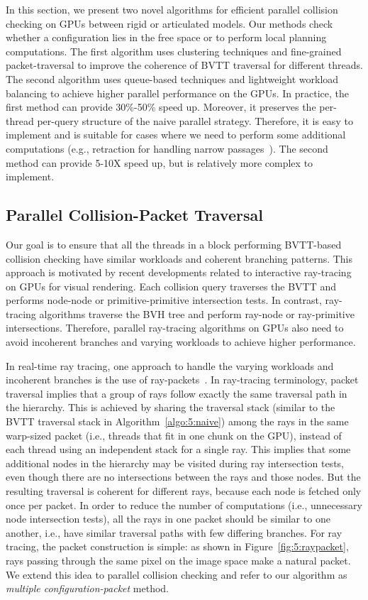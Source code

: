 In this section, we present two novel algorithms for efficient parallel collision checking on GPUs between rigid or articulated models. Our methods check whether a configuration lies in the free space or to perform local planning computations. The first algorithm uses clustering techniques and fine-grained packet-traversal to improve the
coherence of BVTT traversal for different threads. The second algorithm uses queue-based techniques and lightweight workload
balancing to achieve higher parallel performance on the GPUs. In practice, the first method can provide 30\%-50\% speed up.
Moreover, it preserves the per-thread per-query structure of the naive parallel strategy. Therefore, it is easy to implement
and is suitable for cases where we need to perform some additional computations (e.g., retraction for handling narrow passages~\cite{Zhang08-ICRA}). The second method can provide 5-10X speed up, but is relatively more complex to implement.


\subsection{Parallel Collision-Packet Traversal}
\label{sec:5:algorithm:packet}
Our goal is to ensure that all the threads in a block performing BVTT-based collision checking have similar workloads and coherent
branching patterns. This approach is motivated by recent developments related to interactive ray-tracing on GPUs for visual
rendering. Each collision query traverses the BVTT and performs node-node or primitive-primitive intersection tests. In contrast,
ray-tracing algorithms traverse the BVH tree and perform ray-node or ray-primitive intersections. Therefore, parallel ray-tracing
algorithms on GPUs also need to avoid incoherent branches and varying workloads to achieve higher performance.

In real-time ray tracing, one approach to handle the varying workloads and incoherent branches is the
use of ray-packets~\cite{Gunther07,Aila2009}. In ray-tracing terminology, packet traversal implies that a group of
rays follow
exactly the same traversal path in the hierarchy. This is achieved by sharing the traversal stack (similar to the BVTT traversal stack in Algorithm~\ref{algo:5:naive}) among the rays in the same warp-sized packet (i.e., threads that fit in one chunk on the GPU), instead of each thread using an independent stack for a single ray.
This implies that some additional nodes in the hierarchy may be visited during ray intersection tests, even though there are no intersections between the rays and those nodes. But the resulting traversal is coherent for different rays, because each node is fetched only once per packet. In order to reduce the number of computations (i.e., unnecessary node intersection tests), all the rays in one packet should be similar to one another, i.e., have similar traversal paths with few differing branches. For ray tracing, the packet construction is simple: as shown in Figure~\ref{fig:5:raypacket}, rays passing through the same pixel on the image space make a natural packet. We extend this idea to parallel collision checking and refer to our algorithm as \emph{multiple configuration-packet} method.


